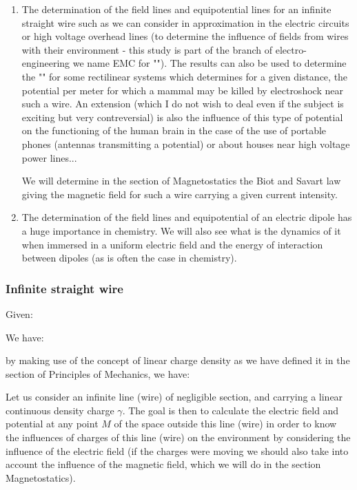 	\begin{enumerate}
		\item The determination of the field lines and equipotential lines for an infinite straight wire such as we can consider in approximation in the electric circuits or high voltage overhead lines (to determine the influence of fields from wires with their environment - this study is part of the branch of electro-engineering we name EMC for ""). The results can also be used to determine the "" for some rectilinear systems which determines for a given distance, the potential per meter for which a mammal may be killed by electroshock near such a wire. An extension (which I do not wish to deal even if the subject is exciting but very contreversial) is also the influence of this type of potential on the functioning of the human brain in the case of the use of portable phones (antennas transmitting a potential) or about houses near high voltage power lines...
		\begin{tcolorbox}[title=Remark,colframe=black,arc=10pt]
		We will determine in the section of Magnetostatics the Biot and Savart law giving the magnetic field for such a wire carrying a given current intensity.
		\end{tcolorbox}
		
		\item The determination of the field lines and equipotential of an electric dipole has a huge importance in chemistry. We will also see what is the dynamics of it when immersed in a uniform electric field and the energy of interaction between dipoles (as is often the case in chemistry).
	\end{enumerate}
	
	\subsubsection{Infinite straight wire}
	Given:
	
	We have:
	
	by making use of the concept of linear charge density as we have defined it in the section of Principles of Mechanics, we have:
	
	Let us consider an infinite line (wire) of negligible section, and carrying a linear continuous density charge $\gamma$. The goal is then to calculate the electric field and potential at any point $M$ of the space outside this line (wire) in order to know the influences of charges of this line (wire) on the environment by considering the influence of the electric field (if the charges were moving we should also take into account the influence of the magnetic field, which we will do in the section Magnetostatics).
	
